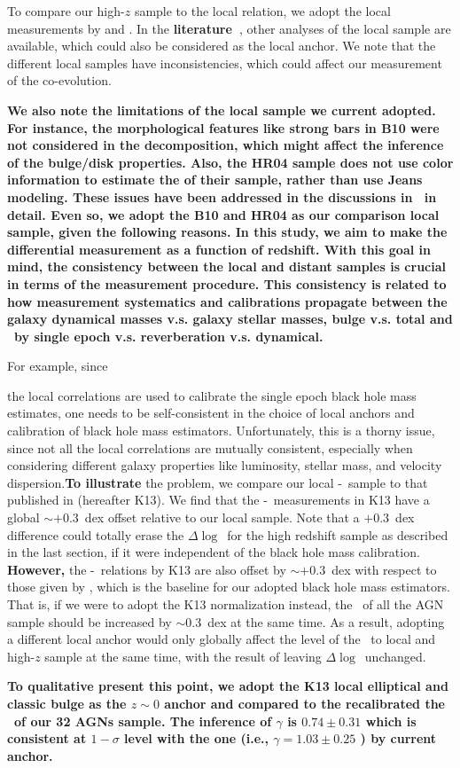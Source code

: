 \documentclass[apj]{emulateapj}
\begin{document}
To compare our high-$z$ sample to the local relation, we adopt the local measurements by \citet{Ben++10, Bennert++2011} and \citet{H+R04}. In the {\bf literature~\citep{Kormendy13, Bentz2018}}, other analyses of the local sample are available, which could also be considered as the local anchor. We note that the different local samples have inconsistencies, which could affect our measurement of the co-evolution. {\bf We also note the limitations of the local sample we current adopted. For instance, the morphological features like strong bars in B10 were not considered in the decomposition, which might affect the inference of the bulge/disk properties. Also, the HR04 sample does not use color information to estimate the \smass of their sample, rather than use Jeans modeling. These issues have been addressed in the discussions in~\citet{Kormendy13} in detail. Even so, we adopt the B10 and HR04 as our comparison local sample, given the following reasons. In this study, we aim to make the differential measurement as a function of redshift. With this goal in mind, the consistency between the local and distant samples is crucial in terms of the measurement procedure. This consistency is related to how measurement systematics and calibrations propagate between the galaxy dynamical masses v.s. galaxy stellar masses, bulge v.s. total and \mbh\ by single epoch v.s. reverberation v.s. dynamical.

For example, since} the local correlations are used to calibrate the single epoch black hole mass estimates, one needs to be self-consistent in the choice of local anchors and calibration of black hole mass estimators. Unfortunately, this is a thorny issue, since not all the local correlations are mutually consistent, especially when considering different galaxy properties like luminosity, stellar mass, and velocity dispersion.{\bf To illustrate} the problem, we compare our local \mbh-\smass\ sample to that published in \citet{Kormendy13} (hereafter K13). We find that the \mbh-\smass\ measurements in K13 have a global $\sim+0.3$~dex offset relative to our local sample. Note that a $+0.3$~dex difference could totally erase the $\Delta\log$\mbh\ for the high redshift sample as described in the last section, if it were independent of the black hole mass calibration. {\bf However,} the \mbh-\sigstar\ relations by K13 are also offset by  $\sim+0.3$~dex with respect to those given by \citet{Woo2010}, which is the baseline for our adopted black hole mass estimators. That is, if we were to adopt the K13 normalization instead, the \mbh\ of all the AGN sample should be increased by $\sim$0.3~dex at the same time. As a result, adopting a different local anchor would only globally affect the level of the \mbh\ to local and high-$z$ sample at the same time, with the result of leaving $\Delta\log$\mbh\ unchanged. {\bf To qualitative present this point, we adopt the K13 local elliptical and classic bulge as the $z\sim0$ anchor and compared to the recalibrated the \mbh\ of our 32 AGNs sample. The inference of  $\gamma$ is $0.74\pm0.31$ which is consistent at $1-\sigma$ level with the one (i.e., $\gamma=1.03\pm0.25$ ) by current anchor.

}
\end{document}
